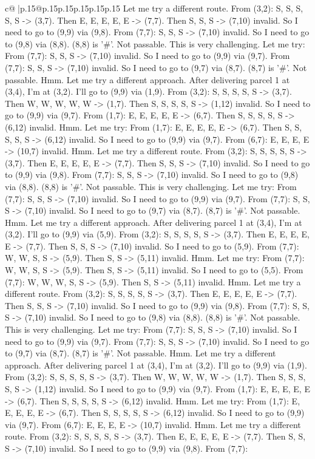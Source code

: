 \documentclass{article}
\begin{document}
{\begin{supertabular}{c@{$\;$}|p{.15\linewidth}@{}p{.15\linewidth}p{.15\linewidth}p{.15\linewidth}p{.15\linewidth}p{.15\linewidth}}
{{{Let me try a different route. From (3,2): S, S, S, S, S {-}> (3,7). Then E, E, E, E, E {-}> (7,7). Then S, S, S {-}> (7,10) invalid. So I need to go to (9,9) via (9,8). From (7,7): S, S, S {-}> (7,10) invalid. So I need to go to (9,8) via (8,8). (8,8) is '\#'. Not passable. This is very challenging. Let me try: From (7,7): S, S, S {-}> (7,10) invalid. So I need to go to (9,9) via (9,7). From (7,7): S, S, S {-}> (7,10) invalid. So I need to go to (9,7) via (8,7). (8,7) is '\#'. Not passable. Hmm. Let me try a different approach. After delivering parcel 1 at (3,4), I'm at (3,2). I'll go to (9,9) via (1,9). From (3,2): S, S, S, S, S {-}> (3,7). Then W, W, W, W, W {-}> (1,7). Then S, S, S, S, S {-}> (1,12) invalid. So I need to go to (9,9) via (9,7). From (1,7): E, E, E, E, E {-}> (6,7). Then S, S, S, S, S {-}> (6,12) invalid. Hmm. Let me try: From (1,7): E, E, E, E, E {-}> (6,7). Then S, S, S, S, S {-}> (6,12) invalid. So I need to go to (9,9) via (9,7). From (6,7): E, E, E, E {-}> (10,7) invalid. Hmm. Let me try a different route. From (3,2): S, S, S, S, S {-}> (3,7). Then E, E, E, E, E {-}> (7,7). Then S, S, S {-}> (7,10) invalid. So I need to go to (9,9) via (9,8). From (7,7): S, S, S {-}> (7,10) invalid. So I need to go to (9,8) via (8,8). (8,8) is '\#'. Not passable. This is very challenging. Let me try: From (7,7): S, S, S {-}> (7,10) invalid. So I need to go to (9,9) via (9,7). From (7,7): S, S, S {-}> (7,10) invalid. So I need to go to (9,7) via (8,7). (8,7) is '\#'. Not passable. Hmm. Let me try a different approach. After delivering parcel 1 at (3,4), I'm at (3,2). I'll go to (9,9) via (5,9). From (3,2): S, S, S, S, S {-}> (3,7). Then E, E, E, E, E {-}> (7,7). Then S, S, S {-}> (7,10) invalid. So I need to go to (5,9). From (7,7): W, W, S, S {-}> (5,9). Then S, S {-}> (5,11) invalid. Hmm. Let me try: From (7,7): W, W, S, S {-}> (5,9). Then S, S {-}> (5,11) invalid. So I need to go to (5,5). From (7,7): W, W, W, S, S {-}> (5,9). Then S, S {-}> (5,11) invalid. Hmm. Let me try a different route. From (3,2): S, S, S, S, S {-}> (3,7). Then E, E, E, E, E {-}> (7,7). Then S, S, S {-}> (7,10) invalid. So I need to go to (9,9) via (9,8). From (7,7): S, S, S {-}> (7,10) invalid. So I need to go to (9,8) via (8,8). (8,8) is '\#'. Not passable. This is very challenging. Let me try: From (7,7): S, S, S {-}> (7,10) invalid. So I need to go to (9,9) via (9,7). From (7,7): S, S, S {-}> (7,10) invalid. So I need to go to (9,7) via (8,7). (8,7) is '\#'. Not passable. Hmm. Let me try a different approach. After delivering parcel 1 at (3,4), I'm at (3,2). I'll go to (9,9) via (1,9). From (3,2): S, S, S, S, S {-}> (3,7). Then W, W, W, W, W {-}> (1,7). Then S, S, S, S, S {-}> (1,12) invalid. So I need to go to (9,9) via (9,7). From (1,7): E, E, E, E, E {-}> (6,7). Then S, S, S, S, S {-}> (6,12) invalid. Hmm. Let me try: From (1,7): E, E, E, E, E {-}> (6,7). Then S, S, S, S, S {-}> (6,12) invalid. So I need to go to (9,9) via (9,7). From (6,7): E, E, E, E {-}> (10,7) invalid. Hmm. Let me try a different route. From (3,2): S, S, S, S, S {-}> (3,7). Then E, E, E, E, E {-}> (7,7). Then S, S, S {-}> (7,10) invalid. So I need to go to (9,9) via (9,8). From (7,7): }}}
\end{supertabular}}
\end{document}
